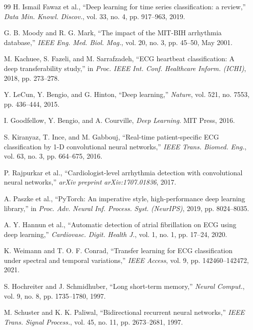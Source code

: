 \documentclass[12pt,a4paper]{report}
\begin{document}
\begin{thebibliography}{99}
H. Ismail Fawaz et al., ``Deep learning for time series classification: a review,'' \textit{Data Min. Knowl. Discov.}, vol. 33, no. 4, pp. 917--963, 2019.

G. B. Moody and R. G. Mark, ``The impact of the MIT-BIH arrhythmia database,'' \textit{IEEE Eng. Med. Biol. Mag.}, vol. 20, no. 3, pp. 45--50, May 2001.

M. Kachuee, S. Fazeli, and M. Sarrafzadeh, ``ECG heartbeat classification: A deep transferability study,'' in \textit{Proc. IEEE Int. Conf. Healthcare Inform. (ICHI)}, 2018, pp. 273--278.

Y. LeCun, Y. Bengio, and G. Hinton, ``Deep learning,'' \textit{Nature}, vol. 521, no. 7553, pp. 436--444, 2015.

I. Goodfellow, Y. Bengio, and A. Courville, \textit{Deep Learning}. MIT Press, 2016.

S. Kiranyaz, T. Ince, and M. Gabbouj, ``Real-time patient-specific ECG classification by 1-D convolutional neural networks,'' \textit{IEEE Trans. Biomed. Eng.}, vol. 63, no. 3, pp. 664--675, 2016.

P. Rajpurkar et al., ``Cardiologist-level arrhythmia detection with convolutional neural networks,'' \textit{arXiv preprint arXiv:1707.01836}, 2017.

A. Paszke et al., ``PyTorch: An imperative style, high-performance deep learning library,'' in \textit{Proc. Adv. Neural Inf. Process. Syst. (NeurIPS)}, 2019, pp. 8024--8035.

A. Y. Hannun et al., ``Automatic detection of atrial fibrillation on ECG using deep learning,'' \textit{Cardiovasc. Digit. Health J.}, vol. 1, no. 1, pp. 17--24, 2020.

K. Weimann and T. O. F. Conrad, ``Transfer learning for ECG classification under spectral and temporal variations,'' \textit{IEEE Access}, vol. 9, pp. 142460--142472, 2021.

S. Hochreiter and J. Schmidhuber, ``Long short-term memory,'' \textit{Neural Comput.}, vol. 9, no. 8, pp. 1735--1780, 1997.

M. Schuster and K. K. Paliwal, ``Bidirectional recurrent neural networks,'' \textit{IEEE Trans. Signal Process.}, vol. 45, no. 11, pp. 2673--2681, 1997.


\end{thebibliography}
\end{document}
